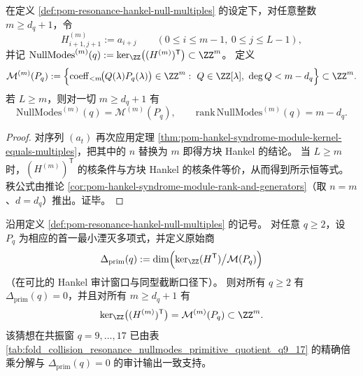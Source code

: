 \begin{proposition}\label{prop:pom-resonance-hankel-null-all-scales}
在定义 \ref{def:pom-resonance-hankel-null-multiples} 的设定下，对任意整数 \(m\ge d_q+1\)，令
\[
H^{(m)}_{i+1,j+1}:=a_{i+j}\qquad(0\le i\le m-1,\ 0\le j\le L-1),
\]
并记
\(
\mathrm{NullModes}^{(m)}(q):=\ker_{\ZZ}\bigl((H^{(m)})^{\mathsf T}\bigr)\subset\ZZ^{m}
\)。
定义
\[
\mathcal{M}^{(m)}(P_q):=
\Bigl\{\operatorname{coeff}_{<m}\!\bigl(Q(\lambda)P_q(\lambda)\bigr)\in\ZZ^m:\ 
Q\in\ZZ[\lambda],\ \deg Q<m-d_q\Bigr\}\subset\ZZ^m.
\]
若 \(L\ge m\)，则对一切 \(m\ge d_q+1\) 有
\[
\boxed{\;\mathrm{NullModes}^{(m)}(q)=\mathcal{M}^{(m)}(P_q),\qquad \mathrm{rank}\,\mathrm{NullModes}^{(m)}(q)=m-d_q.\;}
\]
\end{proposition}
\begin{proof}
对序列 \((a_t)\) 再次应用定理 \ref{thm:pom-hankel-syndrome-module-kernel-equals-multiples}，把其中的 \(n\) 替换为 \(m\) 即得方块 Hankel 的结论。
当 \(L\ge m\) 时，\((H^{(m)})^{\mathsf T}\) 的核条件与方块 Hankel 的核条件等价，从而得到所示恒等式。
秩公式由推论 \ref{cor:pom-hankel-syndrome-module-rank-and-generators}（取 \(n=m\)、\(d=d_q\)）推出。证毕。
\end{proof}

\begin{conjecture}[原始商消失与全尺度主理想性]\label{conj:pom-resonance-hankel-null-principal-all-q}
沿用定义 \ref{def:pom-resonance-hankel-null-multiples} 的记号。
对任意 \(q\ge 2\)，设 \(P_q\) 为相应的首一最小湮灭多项式，并定义原始商
\[
\Delta_{\mathrm{prim}}(q):=\dim\Bigl(\ker_{\ZZ}(H^{\mathsf T})\big/\mathcal{M}(P_q)\Bigr)
\]
（在可比的 Hankel 审计窗口与同型截断口径下）。
则对所有 \(q\ge 2\) 有 \(\Delta_{\mathrm{prim}}(q)=0\)，并且对所有 \(m\ge d_q+1\) 有
\[
\ker_{\ZZ}\bigl((H^{(m)})^{\mathsf T}\bigr)=\mathcal{M}^{(m)}(P_q)\subset\ZZ^m.
\]
该猜想在共振窗 \(q=9,\dots,17\) 已由表 \ref{tab:fold_collision_resonance_nullmodes_primitive_quotient_q9_17} 的精确倍乘分解与 \(\Delta_{\mathrm{prim}}(q)=0\) 的审计输出一致支持。
\end{conjecture}

\endinput
